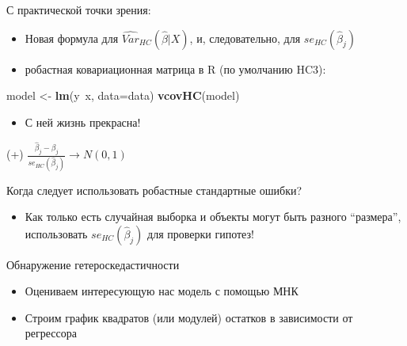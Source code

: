 \documentclass[ignorenonframetext,]{beamer}
\newenvironment{Shaded}{\begin{snugshade}}{\end{snugshade}}
\newcommand{\KeywordTok}[1]{\textcolor[rgb]{0.13,0.29,0.53}{\textbf{{#1}}}}
\newcommand{\DataTypeTok}[1]{\textcolor[rgb]{0.13,0.29,0.53}{{#1}}}
\newcommand{\StringTok}[1]{\textcolor[rgb]{0.31,0.60,0.02}{{#1}}}
\newcommand{\NormalTok}[1]{{#1}}
\begin{document}
\begin{frame}[fragile]{С практической точки зрения:}

\begin{itemize}
\item
  Новая формула для $\widehat{Var}_{HC}(\hat{\beta}|X)$, и,
  следовательно, для $se_{HC}(\hat{\beta}_j)$
\item
  робастная ковариационная матрица в R (по умолчанию HC3):
\end{itemize}

\begin{Shaded}
\begin{Highlighting}[]
\NormalTok{model <-}\StringTok{ }\KeywordTok{lm}\NormalTok{(y~x, }\DataTypeTok{data=}\NormalTok{data)}
\KeywordTok{vcovHC}\NormalTok{(model)}
\end{Highlighting}
\end{Shaded}

\begin{itemize}
\itemsep1pt\parskip0pt
\item
  С ней жизнь прекрасна!
\end{itemize}

(+) $\frac{\hat{\beta}_j-\beta_j}{se_{HC}(\hat{\beta}_j)} \to N(0,1)$

\end{frame}

\begin{frame}{Когда следует использовать робастные стандартные ошибки?}

\begin{itemize}
\itemsep1pt\parskip0pt
\item
  Как только есть случайная выборка и объекты могут быть разного
  ``размера'', использовать $se_{HC}(\hat{\beta}_j)$ для проверки
  гипотез!
\end{itemize}

\end{frame}

\begin{frame}{Обнаружение гетероскедастичности}

\begin{itemize}
\item
  Оцениваем интересующую нас модель с помощью МНК
\item
  Строим график квадратов (или модулей) остатков в зависимости от
  регрессора
\end{itemize}

\end{frame}
\end{document}
